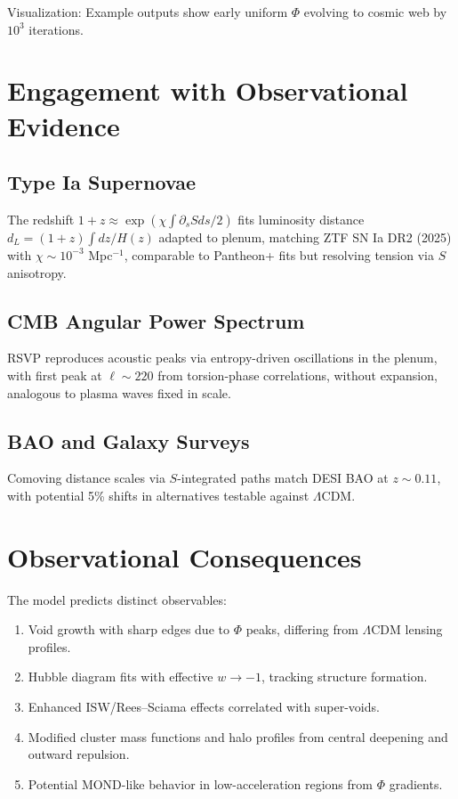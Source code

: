 \documentclass[11pt]{article}
\theoremstyle{plain}
\theoremstyle{definition}
\begin{document}
Visualization: Example outputs show early uniform $\Phi$ evolving to cosmic web by $10^3$ iterations.

\section{Engagement with Observational Evidence}
\subsection{Type Ia Supernovae}
The redshift $1+z \approx \exp(\chi \int \partial_s S ds / 2)$ fits luminosity distance $d_L = (1+z) \int dz / H(z)$ adapted to plenum, matching ZTF SN Ia DR2 (2025) with $\chi \sim 10^{-3}$ Mpc$^{-1}$, comparable to Pantheon+ fits but resolving tension via $S$ anisotropy.

\subsection{CMB Angular Power Spectrum}
RSVP reproduces acoustic peaks via entropy-driven oscillations in the plenum, with first peak at $\ell \sim 220$ from torsion-phase correlations, without expansion, analogous to plasma waves fixed in scale.

\subsection{BAO and Galaxy Surveys}
Comoving distance scales via $S$-integrated paths match DESI BAO at $z\sim0.11$, with potential 5\% shifts in alternatives testable against $\Lambda$CDM.

\section{Observational Consequences}
The model predicts distinct observables:
\begin{enumerate}
\item Void growth with sharp edges due to $\Phi$ peaks, differing from $\Lambda$CDM lensing profiles.
\item Hubble diagram fits with effective $w \to -1$, tracking structure formation.
\item Enhanced ISW/Rees--Sciama effects correlated with super-voids.
\item Modified cluster mass functions and halo profiles from central deepening and outward repulsion.
\item Potential MOND-like behavior in low-acceleration regions from $\Phi$ gradients.
\end{enumerate}
\end{document}
